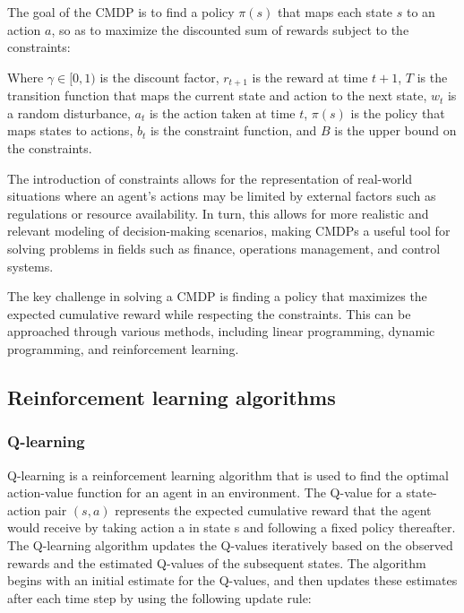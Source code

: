 \documentclass[
  12pt,
  a4paper,
  DIV=11,
  numbers=noendperiod]{scrartcl}
\begin{document}
The goal of the CMDP is to find a policy \(\pi(s)\) that maps each state
\(s\) to an action \(a\), so as to maximize the discounted sum of
rewards subject to the constraints:

Where \(\gamma \in [0,1)\) is the discount factor, \(r_{t+1}\) is the
reward at time \(t+1\), \(T\) is the transition function that maps the
current state and action to the next state, \(w_t\) is a random
disturbance, \(a_t\) is the action taken at time \(t\), \(\pi(s)\) is
the policy that maps states to actions, \(b_t\) is the constraint
function, and \(B\) is the upper bound on the constraints.

The introduction of constraints allows for the representation of
real-world situations where an agent's actions may be limited by
external factors such as regulations or resource availability. In turn,
this allows for more realistic and relevant modeling of decision-making
scenarios, making CMDPs a useful tool for solving problems in fields
such as finance, operations management, and control systems.

The key challenge in solving a CMDP is finding a policy that maximizes
the expected cumulative reward while respecting the constraints. This
can be approached through various methods, including linear programming,
dynamic programming, and reinforcement learning.

\hypertarget{reinforcement-learning-algorithms}{%
\subsection{Reinforcement learning
algorithms}\label{reinforcement-learning-algorithms}}

\hypertarget{q-learning}{%
\subsubsection{Q-learning}\label{q-learning}}

Q-learning is a reinforcement learning algorithm that is used to find
the optimal action-value function for an agent in an environment. The
Q-value for a state-action pair \((s, a)\) represents the expected
cumulative reward that the agent would receive by taking action a in
state s and following a fixed policy thereafter. The Q-learning
algorithm updates the Q-values iteratively based on the observed rewards
and the estimated Q-values of the subsequent states. The algorithm
begins with an initial estimate for the Q-values, and then updates these
estimates after each time step by using the following update rule:
\end{document}
